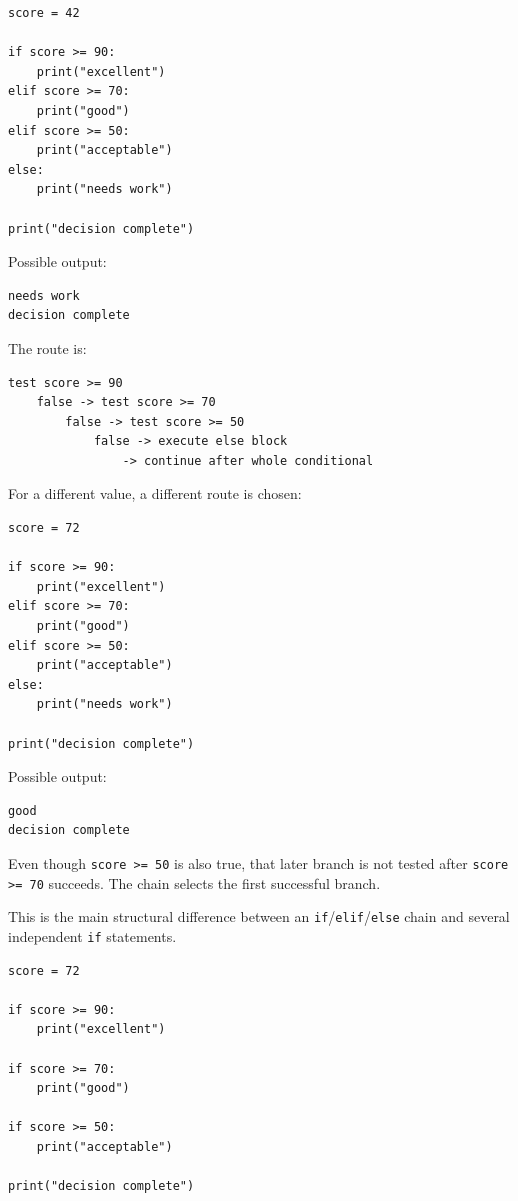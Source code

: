 \begin{verbatim}
score = 42

if score >= 90:
    print("excellent")
elif score >= 70:
    print("good")
elif score >= 50:
    print("acceptable")
else:
    print("needs work")

print("decision complete")
\end{verbatim}

Possible output:

\begin{verbatim}
needs work
decision complete
\end{verbatim}

The route is:

\begin{verbatim}
test score >= 90
    false -> test score >= 70
        false -> test score >= 50
            false -> execute else block
                -> continue after whole conditional
\end{verbatim}

For a different value, a different route is chosen:

\begin{verbatim}
score = 72

if score >= 90:
    print("excellent")
elif score >= 70:
    print("good")
elif score >= 50:
    print("acceptable")
else:
    print("needs work")

print("decision complete")
\end{verbatim}

Possible output:

\begin{verbatim}
good
decision complete
\end{verbatim}

Even though \texttt{score >= 50} is also true, that later branch is not tested after \texttt{score >= 70} succeeds. The chain selects the first successful branch.

This is the main structural difference between an \texttt{if}/\texttt{elif}/\texttt{else} chain and several independent \texttt{if} statements.

\begin{verbatim}
score = 72

if score >= 90:
    print("excellent")

if score >= 70:
    print("good")

if score >= 50:
    print("acceptable")

print("decision complete")
\end{verbatim}


